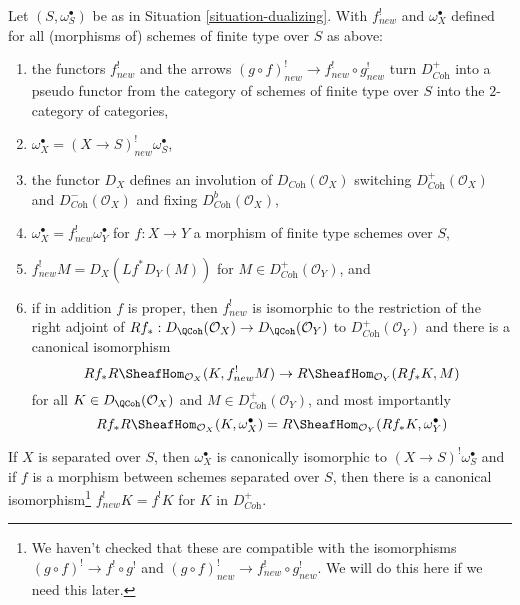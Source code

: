 \begin{lemma}
\label{lemma-duality-bootstrap}
Let $(S, \omega_S^\bullet)$ be as in Situation \ref{situation-dualizing}.
With $f^!_{new}$ and $\omega_X^\bullet$ defined for all (morphisms of)
schemes of finite type over $S$ as above:
\begin{enumerate}
\item the functors $f^!_{new}$ and the arrows
$(g \circ f)^!_{new} \to f^!_{new} \circ g^!_{new}$
turn $D_{\textit{Coh}}^+$ into a pseudo functor from the category of
schemes of finite type over $S$ into the $2$-category of categories,
\item $\omega_X^\bullet = (X \to S)^!_{new} \omega_S^\bullet$,
\item the functor $D_X$
defines an involution of $D_{\textit{Coh}}(\mathcal{O}_X)$
switching $D_{\textit{Coh}}^+(\mathcal{O}_X)$ and
$D_{\textit{Coh}}^-(\mathcal{O}_X)$ and fixing
$D_{\textit{Coh}}^b(\mathcal{O}_X)$,
\item $\omega_X^\bullet = f^!_{new}\omega_Y^\bullet$ for
$f : X \to Y$ a morphism of finite type schemes over $S$,
\item $f^!_{new}M = D_X(Lf^*D_Y(M))$ for
$M \in D_{\textit{Coh}}^+(\mathcal{O}_Y)$, and
\item if in addition $f$ is proper, then $f^!_{new}$ is isomorphic
to the restriction of the right adjoint of
$Rf_* : D_\QCoh(\mathcal{O}_X) \to D_\QCoh(\mathcal{O}_Y)$ to
$D_{\textit{Coh}}^+(\mathcal{O}_Y)$ and there is a canonical isomorphism
$$
Rf_*R\SheafHom_{\mathcal{O}_X}(K, f^!_{new}M)
\to
R\SheafHom_{\mathcal{O}_Y}(Rf_*K, M)
$$
for all $K \in D_\QCoh(\mathcal{O}_X)$ and
$M \in D_{\textit{Coh}}^+(\mathcal{O}_Y)$, and most importantly
$$
Rf_*R\SheafHom_{\mathcal{O}_X}(K, \omega_X^\bullet) =
R\SheafHom_{\mathcal{O}_Y}(Rf_*K, \omega_Y^\bullet)
$$
\end{enumerate}
If $X$ is separated over $S$, then
$\omega_X^\bullet$ is canonically isomorphic to
$(X \to S)^!\omega_S^\bullet$ and
if $f$ is a morphism between schemes separated
over $S$, then there is a canonical isomorphism\footnote{We haven't
checked that these are compatible with the isomorphisms
$(g \circ f)^! \to f^! \circ g^!$ and
$(g \circ f)^!_{new} \to f^!_{new} \circ g^!_{new}$. We will do this
here if we need this later.}
$f_{new}^!K = f^!K$ for $K$ in $D_{\textit{Coh}}^+$.
\end{lemma}

